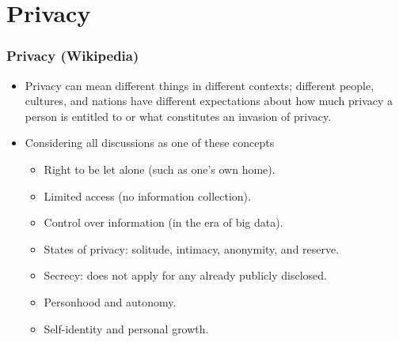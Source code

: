 \documentclass[aspectratio=169, xcolor=table, notheorems, hyperref={pdfpagelabels=false}]{beamer}
\begin{document}
\section{Privacy}
\begin{frame}[fragile]
\frametitle{Privacy (Wikipedia)}
\begin{itemize}
\item Privacy can mean different things in different contexts; different people, 
      cultures, and nations have different expectations about how much privacy 
      a person is entitled to or what constitutes an invasion of privacy.
\item Considering all discussions as one of these concepts
\begin{itemize}
\item Right to be let alone (such as one's own home).
\item Limited access (no information collection).
\item Control over information (in the era of big data).
\item States of privacy: solitude, intimacy, anonymity, and reserve.
\item Secrecy: does not apply for any already publicly disclosed.
\item Personhood and autonomy.
\item Self-identity and personal growth.
\end{itemize}
\end{itemize}
\end{frame}
\end{document}
